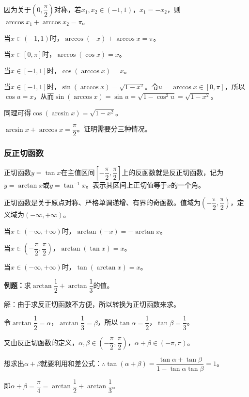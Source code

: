 \documentclass[UTF8, 12pt]{ctexart}
\begin{document}
        因为关于$\left(0,\dfrac{\pi}{2}\right)$对称，若$x_1,x_2\in(-1,1)$，$x_1=-x_2$，则$\arccos x_1+\arccos x_2=\pi$。

        当$x\in(-1,1)$时，$\arccos(-x)+\arccos x=\pi$。

        当$x\in[0,\pi]$时，$\arccos(\cos x)=x$。

        当$x\in[-1,1]$时，$\cos(\arccos x)=x$。

        当$x\in[-1,1]$时，$\sin(\arccos x)=\sqrt{1-x^2}$。令$u=\arccos x\in[0,\pi]$，所以$\cos u=x$，从而$\sin(\arccos x)=\sin u=\sqrt{1-\cos^2u}=\sqrt{1-x^2}$。

        同理可得$\cos(\arcsin x)=\sqrt{1-x^2}$。

        $\arcsin x+\arccos x=\dfrac{\pi}{2}$。证明需要分三种情况。

        \subsubsection{反正切函数}

        正切函数$y=\tan x$在主值区间$\left[-\dfrac{\pi}{2},\dfrac{\pi}{2}\right]$上的反函数就是反正切函数，记为$y=\arctan x$或$y=\tan^{-1}x$。表示其区间上正切值等于$x$的一个角。

        正切函数是关于原点对称、严格单调递增、有界的奇函数。值域为$\left(-\dfrac{\pi}{2},\dfrac{\pi}{2}\right)$，定义域为$(-\infty,+\infty)$。

        当$x\in(-\infty,+\infty)$时，$\arctan(-x)=-\arctan x$。

        当$x\in\left(-\dfrac{\pi}{2},\dfrac{\pi}{2}\right)$，$\arctan(\tan x)=x$。

        当$x\in(-\infty,+\infty)$时，$\tan(\arctan x)=x$。

        \textbf{例题：}求$\arctan\dfrac{1}{2}+\arctan\dfrac{1}{3}$的值。

        解：由于求反正切函数不方便，所以转换为正切函数来求。

        令$\arctan\dfrac{1}{2}=\alpha$，$\arctan\dfrac{1}{3}=\beta$，所以$\tan\alpha=\dfrac{1}{2}$，$\tan\beta=\dfrac{1}{3}$。

        又由反正切函数的定义，$\alpha,\beta\in\left(-\dfrac{\pi}{2},\dfrac{\pi}{2}\right)$，$\alpha+\beta\in(-\pi,\pi)$。

        想求出$\alpha+\beta$就要利用和差公式：$\therefore\tan(\alpha+\beta)=\dfrac{\tan\alpha+\tan\beta}{1-\tan\alpha\tan\beta}=1$。

        即$\alpha+\beta=\dfrac{\pi}{4}=\arctan\dfrac{1}{2}+\arctan\dfrac{1}{3}$。
\end{document}
